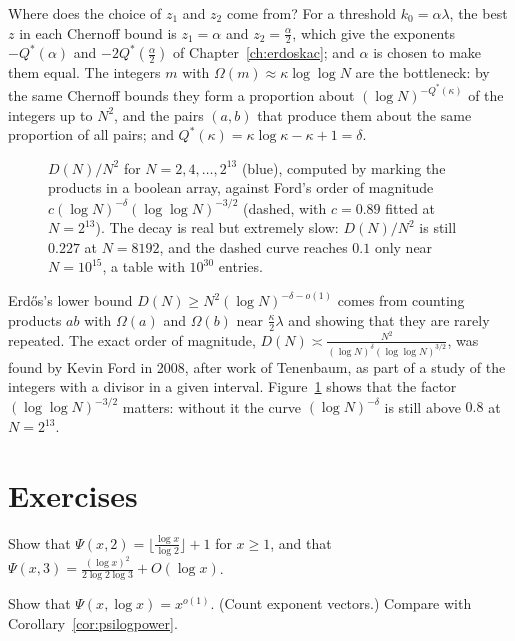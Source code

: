 Where does the choice of $z_1$ and $z_2$ come from? For a threshold $k_0=\alpha\lambda$, the best $z$ in each Chernoff bound is $z_1=\alpha$ and $z_2=\frac\alpha2$, which give the exponents $-Q^*(\alpha)$ and $-2Q^*(\frac\alpha2)$ of Chapter~\ref{ch:erdoskac}; and $\alpha$ is chosen to make them equal. The integers $m$ with $\Omega(m)\approx\kappa\log\log N$ are the bottleneck: by the same Chernoff bounds they form a proportion about $(\log N)^{-Q^*(\kappa)}$ of the integers up to $N^2$, and the pairs $(a,b)$ that produce them about the same proportion of all pairs; and $Q^*(\kappa)=\kappa\log\kappa-\kappa+1=\delta$.

\begin{figure}[ht]
\centering{}
\caption{$D(N)/N^2$ for $N=2,4,\dots,2^{13}$ (blue), computed by marking the products in a boolean array, against Ford's order of magnitude $c(\log N)^{-\delta}(\log\log N)^{-3/2}$ (dashed, with $c=0.89$ fitted at $N=2^{13}$). The decay is real but extremely slow: $D(N)/N^2$ is still $0.227$ at $N=8192$, and the dashed curve reaches $0.1$ only near $N=10^{15}$, a table with $10^{30}$ entries.}
\label{fig:table}
\end{figure}

\begin{remark}
Erd\H{o}s's lower bound $D(N)\ge N^2(\log N)^{-\delta-o(1)}$ comes from counting products $ab$ with $\Omega(a)$ and $\Omega(b)$ near $\frac\kappa2\lambda$ and showing that they are rarely repeated. The exact order of magnitude, $D(N)\asymp\frac{N^2}{(\log N)^\delta(\log\log N)^{3/2}}$, was found by Kevin Ford in 2008, after work of Tenenbaum, as part of a study of the integers with a divisor in a given interval. Figure~\ref{fig:table} shows that the factor $(\log\log N)^{-3/2}$ matters: without it the curve $(\log N)^{-\delta}$ is still above $0.8$ at $N=2^{13}$.
\end{remark}

\section{Exercises}

\begin{exercise}[$\star$]\label{ex:psi23}
Show that $\Psi(x,2)=\lfloor\frac{\log x}{\log2}\rfloor+1$ for $x\ge1$, and that $\Psi(x,3)=\frac{(\log x)^2}{2\log2\log3}+O(\log x)$.
\end{exercise}

\begin{exercise}[$\star\star$]\label{ex:psilog}
Show that $\Psi(x,\log x)=x^{o(1)}$. (Count exponent vectors.) Compare with Corollary~\ref{cor:psilogpower}.
\end{exercise}

